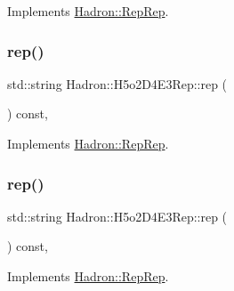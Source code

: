 Implements \mbox{\hyperlink{structHadron_1_1RepRep_ab3213025f6de249f7095892109575fde}{Hadron\+::\+Rep\+Rep}}.

\mbox{\label{structHadron_1_1H5o2D4E3Rep_ab2c75db69668bb5a4d127992c3441ea4}} 
\subsubsection{\texorpdfstring{rep()}{rep()}\hspace{0.1cm}{\footnotesize\ttfamily [2/5]}}
{\footnotesize\ttfamily std\+::string Hadron\+::\+H5o2\+D4\+E3\+Rep\+::rep (\begin{DoxyParamCaption}{ }\end{DoxyParamCaption}) const\hspace{0.3cm}{\ttfamily [inline]}, {\ttfamily [virtual]}}



Implements \mbox{\hyperlink{structHadron_1_1RepRep_ab3213025f6de249f7095892109575fde}{Hadron\+::\+Rep\+Rep}}.

\mbox{\label{structHadron_1_1H5o2D4E3Rep_ab2c75db69668bb5a4d127992c3441ea4}} 
\subsubsection{\texorpdfstring{rep()}{rep()}\hspace{0.1cm}{\footnotesize\ttfamily [3/5]}}
{\footnotesize\ttfamily std\+::string Hadron\+::\+H5o2\+D4\+E3\+Rep\+::rep (\begin{DoxyParamCaption}{ }\end{DoxyParamCaption}) const\hspace{0.3cm}{\ttfamily [inline]}, {\ttfamily [virtual]}}



Implements \mbox{\hyperlink{structHadron_1_1RepRep_ab3213025f6de249f7095892109575fde}{Hadron\+::\+Rep\+Rep}}.

\mbox{\label{structHadron_1_1H5o2D4E3Rep_ab2c75db69668bb5a4d127992c3441ea4}} 
